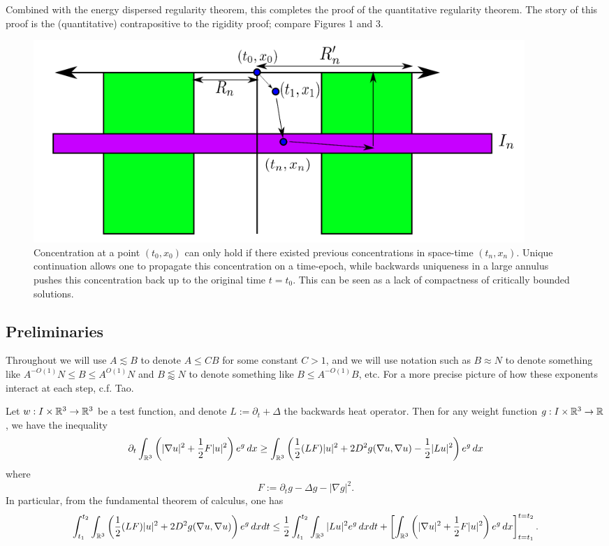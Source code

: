 Combined with the energy dispersed regularity theorem, this completes the proof of the quantitative regularity theorem. The story of this proof is the (quantitative) contrapositive to the rigidity proof; compare Figures 1 and 3. 

\begin{figure}[h]\label{fig2}
	\begin{center}
		\includegraphics{graphics/stack}
		\caption{Concentration at a point $(t_0, x_0)$ can only hold if there existed previous concentrations in space-time $(t_n, x_n)$. Unique continuation allows one to propagate this concentration on a time-epoch, while backwards uniqueness in a large annulus pushes this concentration back up to the original time $t = t_0$. This can be seen as a lack of compactness of critically bounded solutions. }
	\end{center}
\end{figure}

\subsection{Preliminaries}

Throughout we will use $A \lesssim B$ to denote $A \leq CB$ for some constant $C > 1$, and we will use notation such as $B \approx N$ to denote something like $A^{-O(1)} N \leq B \leq A^{O(1)} N$ and $B \lessapprox N$ to denote something like $B \leq A^{-O(1)} B$, etc. For a more precise picture of how these exponents interact at each step, c.f. Tao. 

\begin{lemma}\label{lem:carleman}
	Let $w : I \times \mathbb R^3 \to \mathbb R^3$ be a test function, and denote $L := \partial_t + \Delta$ the backwards heat operator. Then for any weight function $g: I \times \mathbb R^3 \to \mathbb R$, we have the inequality 
		\[
			\partial_t \int_{\mathbb R^3} \left( |\nabla u|^2 + \frac12 F|u|^2 \right) e^g \, dx \geq \int_{\mathbb R^3} \left( \frac12 (LF)|u|^2 + 2D^2 g (\nabla u, \nabla u)  - \frac12 |Lu|^2\right) e^g \, dx
		\]
	where	
		\[
			F:= \partial_t g - \Delta g - |\nabla g|^2.
		\]
	In particular, from the fundamental theorem of calculus, one has
		\[
			\int_{t_1}^{t_2} \int_{\mathbb R^3} \left( \frac12 (LF) |u|^2 + 2D^2 g(\nabla u, \nabla u) \right) e^g \, dx dt 
				\leq \frac12 \int_{t_1}^{t_2} \int_{\mathbb R^3} |Lu|^2 e^g \, dx dt + \left[\int_{\mathbb R^3} \left( |\nabla u|^2 + \frac12 F |u|^2\right) e^g \, dx \right]_{t = t_1}^{t = t_2}.
		\]		
\end{lemma}

